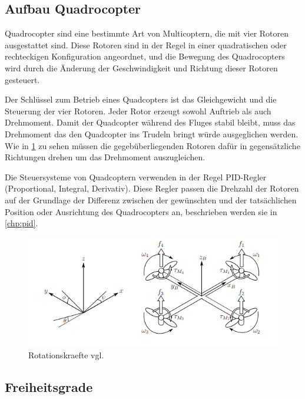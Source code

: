 \cite[vgl.][UAV Fundamentals]{Valavanis2015}
\subsection{Aufbau Quadrocopter}

Quadrocopter sind eine bestimmte Art von Multicoptern, die mit vier Rotoren ausgestattet sind. Diese Rotoren sind in der Regel in einer quadratischen oder rechteckigen Konfiguration angeordnet, und die Bewegung des Quadrocopters wird durch die Änderung der Geschwindigkeit und Richtung dieser Rotoren gesteuert.

Der Schlüssel zum Betrieb eines Quadcopters ist das Gleichgewicht und die Steuerung der vier Rotoren. Jeder Rotor erzeugt sowohl Auftrieb als auch Drehmoment. Damit der Quadcopter während des Fluges stabil bleibt, muss das Drehmoment das den Quadcopter ins Trudeln bringt würde ausgeglichen werden. Wie in \ref{fig:frames} zu sehen müssen die gegebüberliegenden Rotoren dafür in gegensätzliche Richtungen drehen um das Drehmoment auszugleichen.

Die Steuersysteme von Quadcoptern verwenden in der Regel PID-Regler (Proportional, Integral, Derivativ). Diese Regler passen die Drehzahl der Rotoren auf der Grundlage der Differenz zwischen der gewünschten und der tatsächlichen Position oder Ausrichtung des Quadrocopters an, beschrieben werden sie in \ref{chp:pid}.

\cite[vgl.][Quadrocopter Kinematic and Dynamics]{Valavanis2015}

\begin{figure}
    \begin{centering}
        \includegraphics[scale=0.6]{images/inertial_body_frames.png}
        \caption{\label{fig:frames}Rotationskraefte vgl. \cite{luukkonen2011modelling}}
    \end{centering}
\end{figure}


\subsection{Freiheitsgrade}

